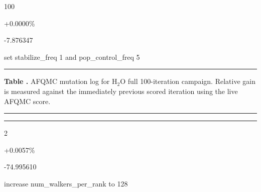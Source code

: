 \noindent\parbox[t]{0.05\linewidth}{\centering\strut 100}\hspace{0.006\linewidth}\parbox[t]{0.04\linewidth}{\centering\strut {}}\hspace{0.006\linewidth}\parbox[t]{0.10\linewidth}{\centering\strut +0.0000\%}\hspace{0.006\linewidth}\parbox[t]{0.115\linewidth}{\centering\strut -7.876347}\hspace{0.006\linewidth}\parbox[t]{0.671\linewidth}{set stabilize\_freq 1 and pop\_control\_freq 5}\par\smallskip
\noindent\rule{\linewidth}{0.5pt}
\par\medskip
{}
\label{tab:supp_afqmc_h2o}
\noindent\textbf{Table \thetable.} AFQMC mutation log for H$_2$O full 100-iteration campaign. Relative gain is measured against the immediately previous scored iteration using the live AFQMC score.
\par\medskip
\noindent\rule{\linewidth}{0.5pt}
\par\smallskip
\noindent\rule{\linewidth}{0.5pt}
\par\smallskip
\noindent\parbox[t]{0.05\linewidth}{\centering\strut 2}\hspace{0.006\linewidth}\parbox[t]{0.04\linewidth}{\centering\strut {}}\hspace{0.006\linewidth}\parbox[t]{0.10\linewidth}{\centering\strut +0.0057\%}\hspace{0.006\linewidth}\parbox[t]{0.115\linewidth}{\centering\strut -74.995610}\hspace{0.006\linewidth}\parbox[t]{0.671\linewidth}{increase num\_walkers\_per\_rank to 128}\par\smallskip
